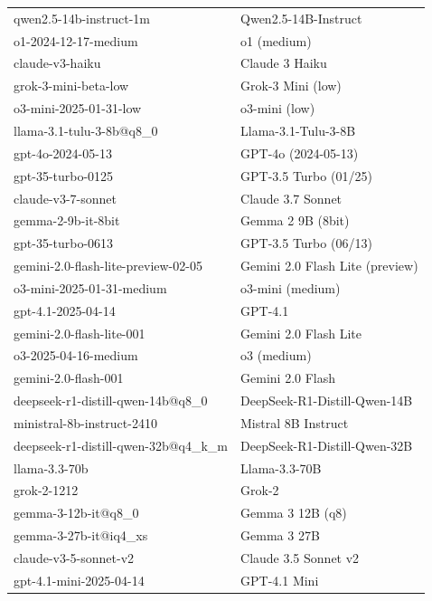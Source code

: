 \documentclass[11pt]{article}
\begin{document}
\begin{table}[htbp]
{\begin{tabular}{ll}
qwen2.5-14b-instruct-1m & Qwen2.5-14B-Instruct \\
o1-2024-12-17-medium & o1 (medium) \\
claude-v3-haiku & Claude 3 Haiku \\
grok-3-mini-beta-low & Grok-3 Mini (low) \\
o3-mini-2025-01-31-low & o3-mini (low) \\
llama-3.1-tulu-3-8b@q8\_0 & Llama-3.1-Tulu-3-8B \\
gpt-4o-2024-05-13 & GPT-4o (2024-05-13) \\
gpt-35-turbo-0125 & GPT-3.5 Turbo (01/25) \\
claude-v3-7-sonnet & Claude 3.7 Sonnet \\
gemma-2-9b-it-8bit & Gemma 2 9B (8bit) \\
gpt-35-turbo-0613 & GPT-3.5 Turbo (06/13) \\
gemini-2.0-flash-lite-preview-02-05 & Gemini 2.0 Flash Lite (preview) \\
o3-mini-2025-01-31-medium & o3-mini (medium) \\
gpt-4.1-2025-04-14 & GPT-4.1 \\
gemini-2.0-flash-lite-001 & Gemini 2.0 Flash Lite \\
o3-2025-04-16-medium & o3 (medium) \\
gemini-2.0-flash-001 & Gemini 2.0 Flash \\
deepseek-r1-distill-qwen-14b@q8\_0 & DeepSeek-R1-Distill-Qwen-14B \\
ministral-8b-instruct-2410 & Mistral 8B Instruct \\
deepseek-r1-distill-qwen-32b@q4\_k\_m & DeepSeek-R1-Distill-Qwen-32B \\
llama-3.3-70b & Llama-3.3-70B \\
grok-2-1212 & Grok-2 \\
gemma-3-12b-it@q8\_0 & Gemma 3 12B (q8) \\
gemma-3-27b-it@iq4\_xs & Gemma 3 27B \\
claude-v3-5-sonnet-v2 & Claude 3.5 Sonnet v2 \\
gpt-4.1-mini-2025-04-14 & GPT-4.1 Mini \\
\bottomrule
\end{tabular}
}
\end{table}
\end{document}
